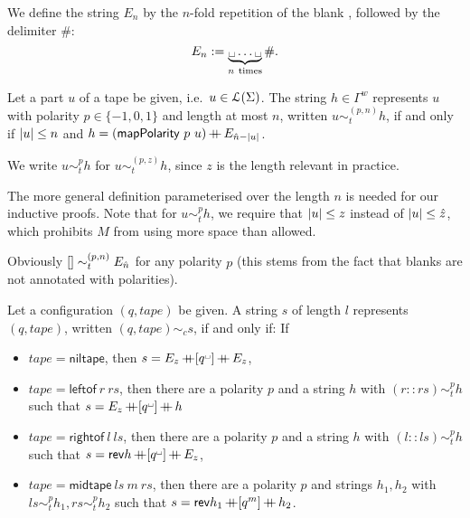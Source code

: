 \documentclass[a4paper,UKenglish,cleveref, autoref]{lipics-v2019}
\begin{document}
\newcommand{\reprt}[1]{\ensuremath{\sim_t^{#1}}}
\newcommand{\reprtt}[2]{\ensuremath{\sim_t^{(#1, #2)}}}
\newcommand{\reprc}{\ensuremath{\sim_c}}

We define the string $E_n$ by the $n$-fold repetition of the blank \blank, followed by the delimiter \#: 
\[ E_n := \underbrace{\blank \ldots \blank}_{n~\text{times}} \#. \]

\begin{definition}
  Let a part $u$ of a tape be given, i.e.\ $u \in \mathcal{L} (\Sigma)$. The string $h \in \Gamma^{w}$ represents $u$ with polarity $p \in \{-1, 0, 1\}$ and length at most $n$, written $u \reprtt{p}{n} h$, if and only if $|u| \le n $ and $h = (\textsf{mapPolarity}~p~u) \mathop{{+}\!\!\!{+}} E_{\hat{n}-|u|}$.

  We write $u \reprt{p} h$ for $u \reprtt{p}{z} h$, since $z$ is the length relevant in practice. 
\end{definition}

The more general definition parameterised over the length $n$ is needed for our inductive proofs. 
Note that for $u \reprt{p} h$, we require that $|u| \le z$ instead of $|u| \le \hat{z}$, which prohibits $M$ from using more space than allowed. 

Obviously $\nil \reprtt{p}{n} E_{\hat{n}}$ for any polarity $p$ (this stems from the fact that blanks are not annotated with polarities).

\begin{definition}
  Let a configuration $(q, \mathit{tape})$ be given. A string $s$ of length $l$ represents $(q, \mathit{tape})$, written $(q, \mathit{tape}) \reprc s$, if and only if: If
  \begin{itemize}
    \item $\mathit{tape} = \textsf{niltape}$, then $s =  E_z \concat [q^\blank] \concat E_z$, 
    \item $\mathit{tape} = \textsf{leftof}~r~rs$, then there are a polarity $p$ and a string $h$ with $(r :: rs) \reprt{p} h$ such that $s = E_z \concat [q^\blank] \concat h$
    \item $\mathit{tape} = \textsf{rightof}~l~ls$, then there are a polarity $p$ and a string $h$ with $(l::ls) \reprt{p} h$ such that $s = \rev{h} \concat [q^\blank] \concat E_z$, 
    \item $\mathit{tape} = \textsf{midtape}~ls~m~rs$, then there are a polarity $p$ and strings $h_1, h_2$ with $ls \reprt{p} h_1, rs \reprt{p} h_2$ such that $s = \mathsf{rev}{h_1} \mathop{{+}\!\!\!{+}} [q^m] \mathop{{+}\!\!\!{+}} h_2$. 
  \end{itemize}
\end{definition}
\end{document}

